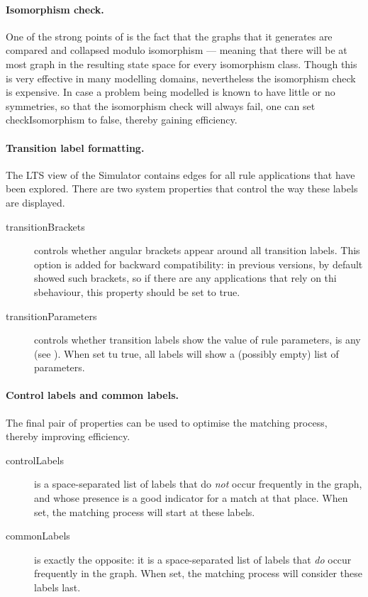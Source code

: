 \paragraph{Isomorphism check.}

One of the strong points of \Groove{} is the fact that the graphs that it
generates are compared and collapsed modulo isomorphism --- meaning that there
will be at most graph in the resulting state space for every isomorphism
class. Though this is very effective in many modelling domains, nevertheless
the isomorphism check is expensive. In case a problem being modelled is known
to have little or no symmetries, so that the isomorphism check will always
fail, one can set \textsf{checkIsomorphism} to \textsf{false}, thereby gaining
efficiency.

\paragraph{Transition label formatting.}

The LTS view of the Simulator contains edges for all rule applications that
have been explored. There are two system properties that control the way these
labels are displayed.
\begin{description}
\item[\textsf{transitionBrackets}] controls whether angular brackets appear
  around all transition labels. This option is added for backward
  compatibility: in previous versions, \Groove{} by default showed such
  brackets, so if there are any applications that rely on thi sbehaviour, this
  property should be set to \textsf{true}.

\item[\textsf{transitionParameters}] controls whether transition labels
  show the value of rule parameters, is any (see ). When set
  tu \textsf{true}, all labels will show a (possibly empty) list of
  parameters.
\end{description}

\paragraph{Control labels and common labels.}

The final pair of properties can be used to optimise the matching process,
thereby improving efficiency.
%
\begin{description}
\item[\textsf{controlLabels}] is a space-separated list of labels that do
  \emph{not} occur frequently in the graph, and whose presence is a good
  indicator for a match at that place. When set, the matching process will
  start at these labels.
\item[\textsf{commonLabels}] is exactly the opposite: it is a space-separated
  list of labels that \emph{do} occur frequently in the graph. When set, the
  matching process will consider these labels last.
\end{description}

